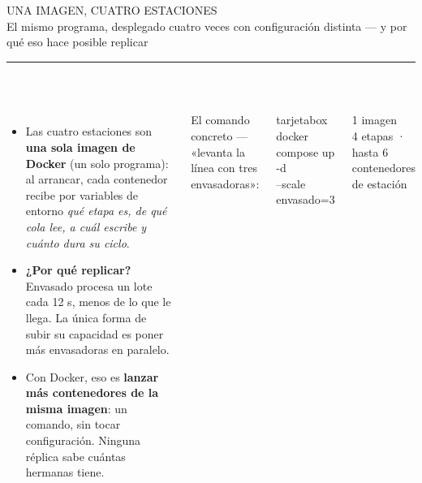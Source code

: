 \documentclass[aspectratio=169,10pt]{beamer}
\newcommand{\titulo}[2]{%
  \vspace{0.12cm}%
  {\dinfont\LARGE\color{marino}\MakeUppercase{#1}}\\[0.3ex]
  {\normalsize\color{grisazul}#2}\\[0.2ex]
  {\color{tealu}\rule{2.2cm}{2pt}}\\[0.6ex]}
\newcommand{\cifra}[2]{%
  \begin{center}{\dinfont\fontsize{34}{36}\selectfont\color{tealu}#1}\\[2pt]
  {\footnotesize\color{grisazul}#2}\end{center}}
\begin{document}
\begin{frame}[fragile]
\titulo{Una imagen, cuatro estaciones}{El mismo programa, desplegado cuatro veces con configuración distinta — y por qué eso hace posible replicar}
\begin{columns}[T]
\begin{itemize}
  \item Las cuatro estaciones son \textbf{una sola imagen de Docker} (un solo programa): al arrancar, cada contenedor recibe por variables de entorno \emph{qué etapa es, de qué cola lee, a cuál escribe y cuánto dura su ciclo}.
  \item \textbf{¿Por qué replicar?} Envasado procesa un lote cada 12 s, menos de lo que le llega. La única forma de subir su capacidad es poner más envasadoras en paralelo.
  \item Con Docker, eso es \textbf{lanzar más contenedores de la misma imagen}: un comando, sin tocar configuración. Ninguna réplica sabe cuántas hermanas tiene.
\end{itemize}
{\footnotesize\color{grisazul}El comando concreto — «levanta la línea con tres envasadoras»:}\\[2pt]
\begin{beamercolorbox}[sep=8pt, rounded=true]{tarjetabox}
{\footnotesize\ttfamily\color{marino}docker compose up -d\\ \hspace*{1em}--scale envasado=3}
\end{beamercolorbox}
\vspace{0.3cm}
\cifra{1 imagen}{4 etapas · hasta 6 contenedores de estación}
\end{columns}
\end{frame}
\end{document}
